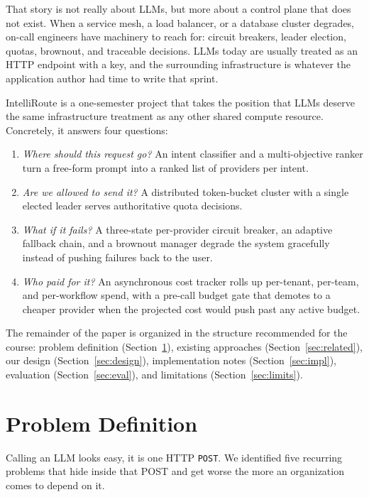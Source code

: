 \documentclass[conference,letterpaper]{IEEEtran}
\begin{document}
That story is not really about LLMs, but more about a control plane
that does not exist. When a service mesh, a load balancer, or a
database cluster degrades, on-call engineers have machinery to reach for: circuit breakers, leader election, quotas,
brownout, and traceable decisions. LLMs today are usually treated as an
HTTP endpoint with a key, and the surrounding infrastructure is
whatever the application author had time to write that sprint.

IntelliRoute is a one-semester project that takes the position that
LLMs deserve the same infrastructure treatment as any other shared
compute resource. Concretely, it answers four questions:

\begin{enumerate}
\item \emph{Where should this request go?} An intent classifier and
      a multi-objective ranker turn a free-form prompt into a ranked
      list of providers per intent.
\item \emph{Are we allowed to send it?} A distributed token-bucket
      cluster with a single elected leader serves authoritative quota
      decisions.
\item \emph{What if it fails?} A three-state per-provider circuit
      breaker, an adaptive fallback chain, and a brownout manager
      degrade the system gracefully instead of pushing failures back
      to the user.
\item \emph{Who paid for it?} An asynchronous cost tracker rolls up
      per-tenant, per-team, and per-workflow spend, with a pre-call
      budget gate that demotes to a cheaper provider when the
      projected cost would push past any active budget.
\end{enumerate}

The remainder of the paper is organized in the structure recommended
for the course: problem definition (Section~\ref{sec:problem}),
existing approaches (Section~\ref{sec:related}), our design
(Section~\ref{sec:design}), implementation notes
(Section~\ref{sec:impl}), evaluation (Section~\ref{sec:eval}), and
limitations (Section~\ref{sec:limits}).

\section{Problem Definition}\label{sec:problem}
Calling an LLM looks easy, it is one HTTP \texttt{POST}. We
identified five recurring problems that hide inside that POST and
get worse the more an organization comes to depend on it.
\end{document}
